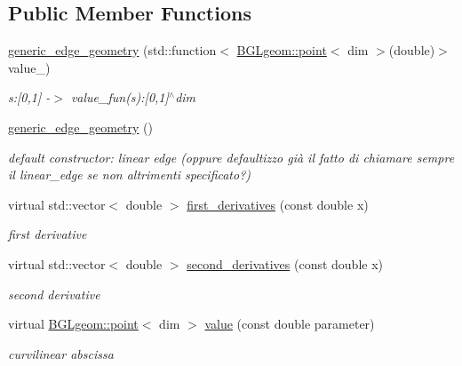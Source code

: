 \subsection*{Public Member Functions}
\begin{DoxyCompactItemize}
\item 
\hyperlink{classBGLgeom_1_1generic__edge__geometry_abc3ee901035797edb931ca75f3dbbdcf}{generic\_\-edge\_\-geometry} (std::function$<$ \hyperlink{classBGLgeom_1_1point}{BGLgeom::point}$<$ dim $>$(double)$>$ value\_\-)
\begin{DoxyCompactList}\small\item\em s:\mbox{[}0,1\mbox{]} -\/$>$ value\_\-fun(s):\mbox{[}0,1\mbox{]}$^\wedge$dim \item\end{DoxyCompactList}\item 
\hypertarget{classBGLgeom_1_1generic__edge__geometry_abf3bcb08edce314687a102a814899e9c}{
\hyperlink{classBGLgeom_1_1generic__edge__geometry_abf3bcb08edce314687a102a814899e9c}{generic\_\-edge\_\-geometry} ()}
\label{classBGLgeom_1_1generic__edge__geometry_abf3bcb08edce314687a102a814899e9c}

\begin{DoxyCompactList}\small\item\em default constructor: linear edge (oppure defaultizzo già il fatto di chiamare sempre il linear\_\-edge se non altrimenti specificato?) \item\end{DoxyCompactList}\item 
virtual std::vector$<$ double $>$ \hyperlink{classBGLgeom_1_1generic__edge__geometry_ad9052ef00b87b9f8ef26a3944ba5e43c}{first\_\-derivatives} (const double x)
\begin{DoxyCompactList}\small\item\em first derivative \item\end{DoxyCompactList}\item 
\hypertarget{classBGLgeom_1_1generic__edge__geometry_a92bb8e77f6d642017313d828123f2907}{
virtual std::vector$<$ double $>$ \hyperlink{classBGLgeom_1_1generic__edge__geometry_a92bb8e77f6d642017313d828123f2907}{second\_\-derivatives} (const double x)}
\label{classBGLgeom_1_1generic__edge__geometry_a92bb8e77f6d642017313d828123f2907}

\begin{DoxyCompactList}\small\item\em second derivative \item\end{DoxyCompactList}\item 
virtual \hyperlink{classBGLgeom_1_1point}{BGLgeom::point}$<$ dim $>$ \hyperlink{classBGLgeom_1_1generic__edge__geometry_a7bb600748e2b9aef8bf8bcb1bb5fec6e}{value} (const double parameter)
\begin{DoxyCompactList}\small\item\em curvilinear abscissa \item\end{DoxyCompactList}\end{DoxyCompactItemize}

